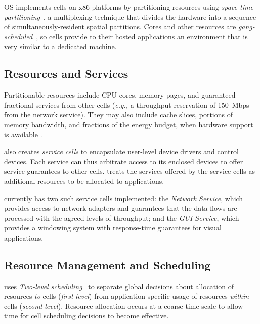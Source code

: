 \tess OS implements cells on x86 platforms by partitioning resources
using \emph{space-time partitioning}~\cite{rushby99,lei03}, 
a multiplexing technique that divides the hardware into a sequence of
simultaneously-resident spatial partitions. 
Cores and other resources are
\textit{gang-scheduled}~\cite{gangsched1982,gangschedpatent}, so
cells provide to their hosted applications an environment that is very
similar to a dedicated machine.

\subsection{Resources and Services} \label{sec:soa} 
Partitionable resources include CPU cores, memory pages, and guaranteed
fractional services from other cells (\emph{e.g.,} a throughput reservation of 150~Mbps
from the network service).  
They may also include cache slices, portions of memory bandwidth, and fractions
of the energy budget, when hardware support is available
\cite{akesson07,lee08memqos,paolieri09,sanchez11}.

\tess also creates \emph{service cells} to encapsulate user-level device drivers and control devices.
Each service can thus arbitrate access to its
enclosed devices to offer service guarantees to
other cells. \tess treats the services
offered by the service cells as additional resources to be allocated to applications.

\tess currently has two such service cells implemented:
the \emph{Network Service}, which provides access to network adapters and
guarantees that the data flows are processed with the agreed levels of
throughput; and the \emph{GUI Service}, which provides a windowing system with
response-time guarantees for visual applications.  


\subsection{Resource Management and Scheduling} 
\tess uses \emph{Two-level scheduling}~\cite{leiner07,ober08} %
to separate global decisions about allocation of resources \emph{to}
cells (\emph{first level}) from application-specific usage of resources
\emph{within} cells (\emph{second level}). 
Resource allocation occurs at a coarse time scale to allow time for cell scheduling decisions to become effective.

